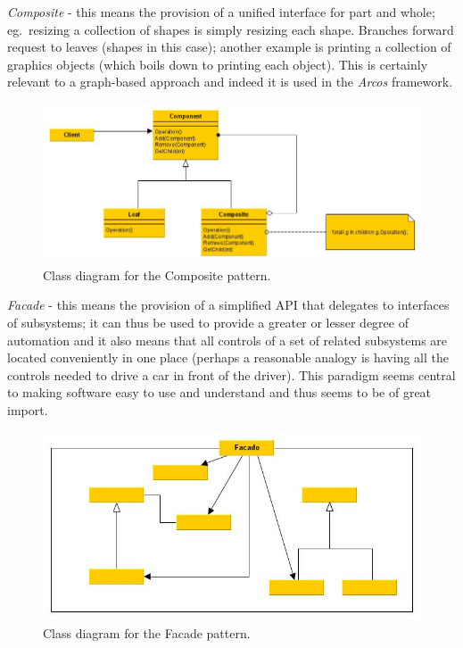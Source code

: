 {\it Composite} - this means the provision of a unified interface for part and whole; eg.\ resizing a collection of shapes is simply resizing each shape.
Branches forward request to leaves (shapes in this case); another example is printing a collection of graphics objects (which boils down to printing each object).  This is certainly relevant to a graph-based approach and indeed it is used in the {\it Arcos} framework.

\begin{figure}
\begin{centering}
\includegraphics[width=12cm]{../png/composite.jpg}
\end{centering}
\caption{Class diagram for the Composite pattern.\label{fig:composite}}
\end{figure}

{\it Facade} - this means the provision of a simplified API that delegates to interfaces of subsystems; it can thus be used to provide a greater or lesser degree of automation and it also means that all controls of a set of related subsystems are located conveniently in one place (perhaps a reasonable analogy is having all the controls needed to drive a car in front of the driver).
This paradigm seems central to making software easy to use and understand and thus seems to be of great import.

\begin{figure}
\begin{centering}
\includegraphics[width=12cm]{../png/facade.jpg}
\end{centering}
\caption{Class diagram for the Facade pattern.\label{fig:facade}}
\end{figure}

